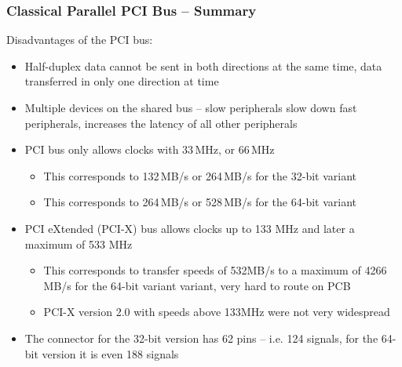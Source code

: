\documentclass{beamer}
\begin{document}
\begin{frame}
\frametitle{Classical Parallel PCI Bus -- Summary}

Disadvantages of the PCI bus:
\begin{itemize}
\item Half-duplex data cannot be sent in both directions at the same time, data transferred in only one direction at time
\item Multiple devices on the shared bus -- slow peripherals slow down fast peripherals, increases the latency of all other peripherals
\item PCI bus only allows clocks with 33\,MHz, or 66\,MHz
\begin{itemize}
\item This corresponds to 132\,MB/s or 264\,MB/s for the 32-bit variant
\item This corresponds to 264\,MB/s or 528\,MB/s for the 64-bit variant
\end{itemize}
\item PCI eXtended (PCI-X) bus allows clocks up to 133 MHz and later a maximum of 533 MHz
\begin{itemize}
\item This corresponds to transfer speeds of 532MB/s to a maximum of 4266 MB/s for the 64-bit variant variant, very hard to route on PCB
\item PCI-X version 2.0 with speeds above 133MHz were not very widespread
\end{itemize}
\item The connector for the 32-bit version has 62 pins -- i.e. 124 signals, for the 64-bit version it is even 188 signals
\end{itemize}

\end{frame}
\end{document}
